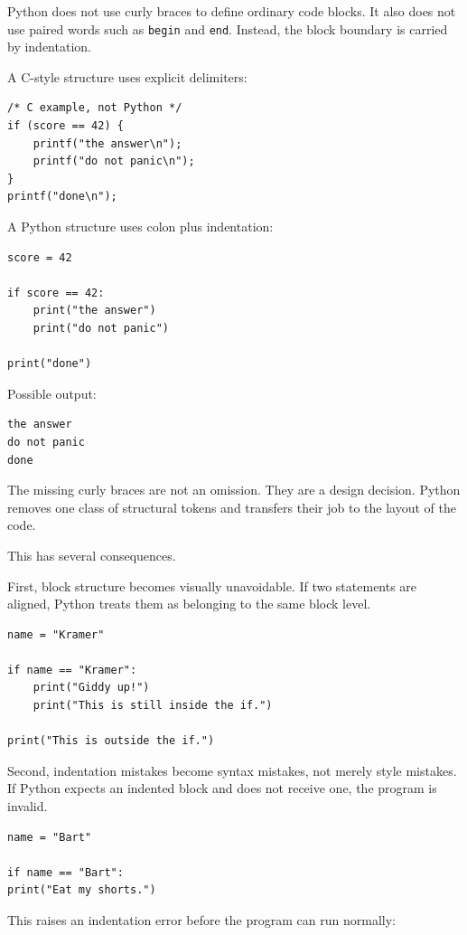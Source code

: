\documentclass[a4paper,twoside]{report}
\begin{document}
Python does not use curly braces to define ordinary code blocks. It also does not use paired words such as \texttt{begin} and \texttt{end}. Instead, the block boundary is carried by indentation.

A C-style structure uses explicit delimiters:

\begin{verbatim}
/* C example, not Python */
if (score == 42) {
    printf("the answer\n");
    printf("do not panic\n");
}
printf("done\n");
\end{verbatim}

A Python structure uses colon plus indentation:

\begin{verbatim}
score = 42

if score == 42:
    print("the answer")
    print("do not panic")

print("done")
\end{verbatim}

Possible output:

\begin{verbatim}
the answer
do not panic
done
\end{verbatim}

The missing curly braces are not an omission. They are a design decision. Python removes one class of structural tokens and transfers their job to the layout of the code.

This has several consequences.

First, block structure becomes visually unavoidable. If two statements are aligned, Python treats them as belonging to the same block level.

\begin{verbatim}
name = "Kramer"

if name == "Kramer":
    print("Giddy up!")
    print("This is still inside the if.")

print("This is outside the if.")
\end{verbatim}

Second, indentation mistakes become syntax mistakes, not merely style mistakes. If Python expects an indented block and does not receive one, the program is invalid.

\begin{verbatim}
name = "Bart"

if name == "Bart":
print("Eat my shorts.")
\end{verbatim}

This raises an indentation error before the program can run normally:
\end{document}
